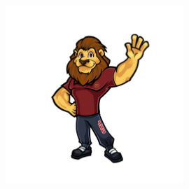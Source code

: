 \documentclass[11pt, letterpaper]{article}
\begin{document}
\begin{figure}
\centering
\includegraphics[width=0.6\textwidth]{logohim.jpg}
\end{figure}
\end{document}
